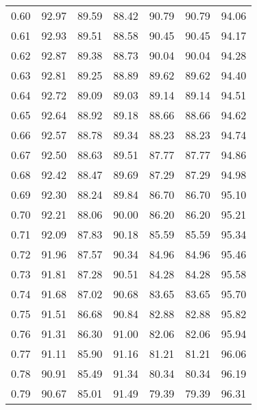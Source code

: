 \begin{tabular}{|c|c|c|c|c|c|c|}
      0.60 &     92.97 &     89.59 &      88.42 &   90.79 &      90.79 &         94.06 \\
      0.61 &     92.93 &     89.51 &      88.58 &   90.45 &      90.45 &         94.17 \\
      0.62 &     92.87 &     89.38 &      88.73 &   90.04 &      90.04 &         94.28 \\
      0.63 &     92.81 &     89.25 &      88.89 &   89.62 &      89.62 &         94.40 \\
      0.64 &     92.72 &     89.09 &      89.03 &   89.14 &      89.14 &         94.51 \\
      0.65 &     92.64 &     88.92 &      89.18 &   88.66 &      88.66 &         94.62 \\
      0.66 &     92.57 &     88.78 &      89.34 &   88.23 &      88.23 &         94.74 \\
      0.67 &     92.50 &     88.63 &      89.51 &   87.77 &      87.77 &         94.86 \\
      0.68 &     92.42 &     88.47 &      89.69 &   87.29 &      87.29 &         94.98 \\
      0.69 &     92.30 &     88.24 &      89.84 &   86.70 &      86.70 &         95.10 \\
      0.70 &     92.21 &     88.06 &      90.00 &   86.20 &      86.20 &         95.21 \\
      0.71 &     92.09 &     87.83 &      90.18 &   85.59 &      85.59 &         95.34 \\
      0.72 &     91.96 &     87.57 &      90.34 &   84.96 &      84.96 &         95.46 \\
      0.73 &     91.81 &     87.28 &      90.51 &   84.28 &      84.28 &         95.58 \\
      0.74 &     91.68 &     87.02 &      90.68 &   83.65 &      83.65 &         95.70 \\
      0.75 &     91.51 &     86.68 &      90.84 &   82.88 &      82.88 &         95.82 \\
      0.76 &     91.31 &     86.30 &      91.00 &   82.06 &      82.06 &         95.94 \\
      0.77 &     91.11 &     85.90 &      91.16 &   81.21 &      81.21 &         96.06 \\
      0.78 &     90.91 &     85.49 &      91.34 &   80.34 &      80.34 &         96.19 \\
      0.79 &     90.67 &     85.01 &      91.49 &   79.39 &      79.39 &         96.31 \\

\end{tabular}
